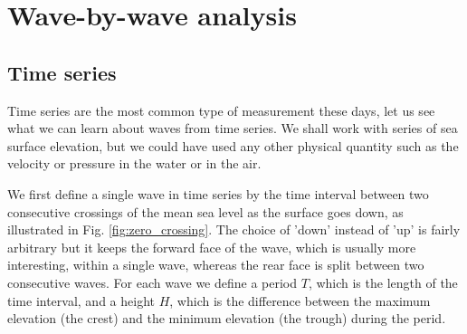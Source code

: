 \section{Wave-by-wave analysis\label{anavague}}
\subsection{Time series}
Time series are the most common type of measurement these days, let us see what we can learn about waves from time series. 
We shall work with series of sea surface elevation, but we could have used any other physical quantity such as the 
velocity or pressure in the water or in the air. 

We first define a single wave in time series by the time interval between two consecutive 
crossings of the mean sea level as the surface goes down, as illustrated in Fig. \ref{fig:zero_crossing}. 
The choice of 'down' instead of 'up' is fairly arbitrary but it 
keeps the forward face of the wave, which is usually  more interesting, within a single wave, whereas the rear face is split 
between two consecutive waves. 
For each wave we define a period $T$, which is the length of the time interval, and a height $H$, which is the 
difference between the maximum elevation (the crest) and the minimum elevation (the trough) during the perid. 




